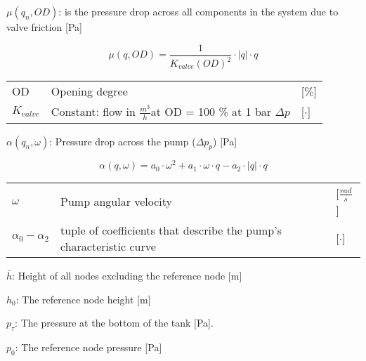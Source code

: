 \medskip
\noindent $\mu(q_n,OD)$: is the pressure drop across all components in the system due to valve friction [\si{Pa}]

\begin{equation*}
	\mu(q, OD) = \frac{1}{K_{valve}(OD)^2} \cdot |q|\cdot q
\end{equation*}

\begin{center}
	\begin{tabular}{l p{10cm} l} 
		OD & Opening degree &	[$ \% $]		\\
		$ K_{valve} $ & Constant: flow in $ \frac{m^3}{h} $at OD = 100 \% at 1 bar $\Delta p$ &	[$\cdot$]		\\
	\end{tabular}
\end{center}

\medskip
\noindent $\alpha(q_n, \omega)$: Pressure drop across the pump ($\Delta p_p$) [\si{Pa}]

\begin{equation*}
	\alpha (q, \omega) = a_0\cdot \omega^2 +  a_1\cdot \omega \cdot q -a_2\cdot |q|\cdot q
\end{equation*}

\begin{center}
	\begin{tabular}{l p{10cm} l} 
		$\omega$ & Pump angular velocity &	[$ \frac{rad}{s} $]		\\
		$ \alpha_0 - \alpha_2 $ & tuple of coefficients that describe the pump's characteristic curve &	[$\cdot$]		\\
	\end{tabular}
\end{center}

\medskip
\noindent $\bar{h}$: Height of all nodes excluding the reference node [m]

\noindent $h_0$: The reference node height [m]

\medskip
\noindent $p_\tau$: The pressure at the bottom of the tank [Pa].

\noindent $p_0$: The reference node pressure [Pa]



